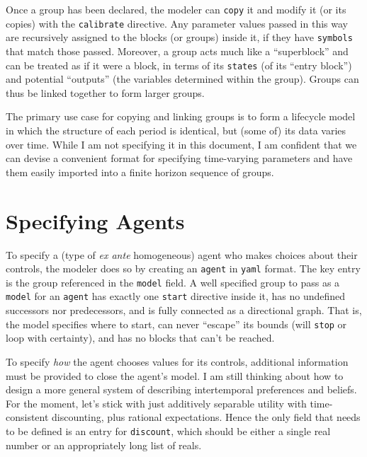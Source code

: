 \documentclass[12pt,pdftex,letterpaper]{article}
\begin{document}
Once a group has been declared, the modeler can \texttt{copy} it and modify it (or its copies) with the \texttt{calibrate} directive. Any parameter values passed in this way are recursively assigned to the blocks (or groups) inside it, if they have \texttt{symbols} that match those passed. Moreover, a group acts much like a ``superblock'' and can be treated as if it were a block, in terms of its \texttt{states} (of its ``entry block'') and potential ``outputs'' (the variables determined within the group). Groups can thus be linked together to form larger groups.

The primary use case for copying and linking groups is to form a lifecycle model in which the structure of each period is identical, but (some of) its data varies over time. While I am not specifying it in this document, I am confident that we can devise a convenient format for specifying time-varying parameters and have them easily imported into a finite horizon sequence of groups.


\section{Specifying Agents}

To specify a (type of \textit{ex ante} homogeneous) agent who makes choices about their controls, the modeler does so by creating an \texttt{agent} in \texttt{yaml} format. The key entry is the group referenced in the \texttt{model} field. A well specified group to pass as a \texttt{model} for an \texttt{agent} has exactly one \texttt{start} directive inside it, has no undefined successors nor predecessors, and is fully connected as a directional graph. That is, the model specifies where to start, can never ``escape'' its bounds (will \texttt{stop} or loop with certainty), and has no blocks that can't be reached.

To specify \textit{how} the agent chooses values for its controls, additional information must be provided to close the agent's model. I am still thinking about how to design a more general system of describing intertemporal preferences and beliefs. For the moment, let's stick with just additively separable utility with time-consistent discounting, plus rational expectations. Hence the only field that needs to be defined is an entry for \texttt{discount}, which should be either a single real number or an appropriately long list of reals.
\end{document}
